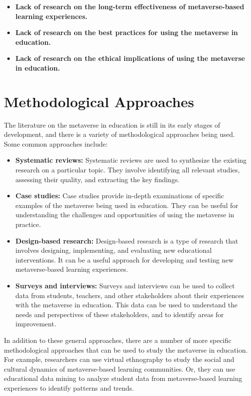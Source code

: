 \documentclass[12pt]{extarticle}
\begin{document}
\begin{itemize}
    \item \textbf{Lack of research on the long-term effectiveness of metaverse-based learning experiences.}
    \item \textbf{Lack of research on the best practices for using the metaverse in education.}
    \item \textbf{Lack of research on the ethical implications of using the metaverse in education.}
\end{itemize}

\section{Methodological Approaches}

The literature on the metaverse in education is still in its early stages of development, and there is a variety of methodological approaches being used. Some common approaches include:

\begin{itemize}
    \item \textbf{Systematic reviews:} Systematic reviews are used to synthesize the existing research on a particular topic. They involve identifying all relevant studies, assessing their quality, and extracting the key findings.
    \item \textbf{Case studies:} Case studies provide in-depth examinations of specific examples of the metaverse being used in education. They can be useful for understanding the challenges and opportunities of using the metaverse in practice.
    \item \textbf{Design-based research:} Design-based research is a type of research that involves designing, implementing, and evaluating new educational interventions. It can be a useful approach for developing and testing new metaverse-based learning experiences.
    \item \textbf{Surveys and interviews:} Surveys and interviews can be used to collect data from students, teachers, and other stakeholders about their experiences with the metaverse in education. This data can be used to understand the needs and perspectives of these stakeholders, and to identify areas for improvement.
\end{itemize}

In addition to these general approaches, there are a number of more specific methodological approaches that can be used to study the metaverse in education. For example, researchers can use virtual ethnography to study the social and cultural dynamics of metaverse-based learning communities. Or, they can use educational data mining to analyze student data from metaverse-based learning experiences to identify patterns and trends.
\end{document}
